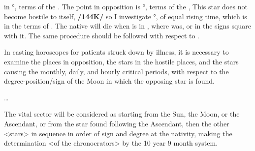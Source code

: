 \Venus\xspace in \Scorpio\xspace 27°, terms of the \Sun. The point in opposition is \Taurus\xspace 27°, terms of the \Sun,
This star does not become hostile to itself, \textbf{/144K/} so I investigate \Scorpio\xspace 27°, of equal rising time,
which is in the terms of \Mercury. The native will die when \Venus\xspace is in \Virgo, where \Mercury\xspace was, or in the signs square with it. The same procedure should be followed with respect to \Mercury.

In casting horoscopes for patients struck down by illness, it is necessary to examine the places in opposition, the stars in the hostile places, and the stars causing the monthly, daily, and hourly critical periods, with respect to the degree-position/sign of the Moon in which the opposing star is found.

\ldots

The vital sector will be considered as starting from the Sun, the Moon, or the Ascendant, or from the star found following the Ascendant, then the other <stars> in sequence in order of sign and degree at the nativity, making the determination <of the chronocrators> by the 10 year 9 month system.


\newpage